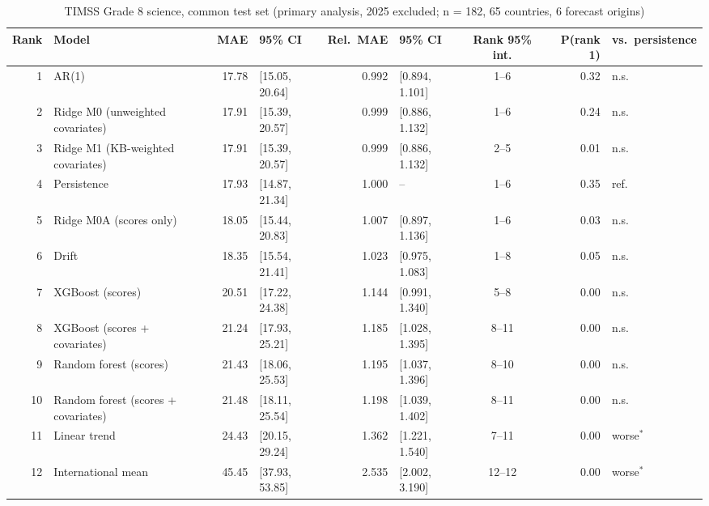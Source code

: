 \begin{table}[htbp]
\centering
\footnotesize
\caption{TIMSS Grade 8 science, common test set (primary analysis, 2025 excluded; n = 182, 65 countries, 6 forecast origins)}
\label{tab:A6}
\begin{tabular}{rlrlrlcrl}
\toprule
Rank & Model & MAE & 95\% CI & Rel.\ MAE & 95\% CI & Rank 95\% int. & P(rank 1) & vs.\ persistence \\
\midrule
1 & AR(1) & 17.78 & [15.05, 20.64] & 0.992 & [0.894, 1.101] & 1--6 & 0.32 & n.s. \\
2 & Ridge M0 (unweighted covariates) & 17.91 & [15.39, 20.57] & 0.999 & [0.886, 1.132] & 1--6 & 0.24 & n.s. \\
3 & Ridge M1 (KB-weighted covariates) & 17.91 & [15.39, 20.57] & 0.999 & [0.886, 1.132] & 2--5 & 0.01 & n.s. \\
4 & Persistence & 17.93 & [14.87, 21.34] & 1.000 & -- & 1--6 & 0.35 & ref. \\
5 & Ridge M0A (scores only) & 18.05 & [15.44, 20.83] & 1.007 & [0.897, 1.136] & 1--6 & 0.03 & n.s. \\
6 & Drift & 18.35 & [15.54, 21.41] & 1.023 & [0.975, 1.083] & 1--8 & 0.05 & n.s. \\
7 & XGBoost (scores) & 20.51 & [17.22, 24.38] & 1.144 & [0.991, 1.340] & 5--8 & 0.00 & n.s. \\
8 & XGBoost (scores + covariates) & 21.24 & [17.93, 25.21] & 1.185 & [1.028, 1.395] & 8--11 & 0.00 & n.s. \\
9 & Random forest (scores) & 21.43 & [18.06, 25.53] & 1.195 & [1.037, 1.396] & 8--10 & 0.00 & n.s. \\
10 & Random forest (scores + covariates) & 21.48 & [18.11, 25.54] & 1.198 & [1.039, 1.402] & 8--11 & 0.00 & n.s. \\
11 & Linear trend & 24.43 & [20.15, 29.24] & 1.362 & [1.221, 1.540] & 7--11 & 0.00 & worse$^{*}$ \\
12 & International mean & 45.45 & [37.93, 53.85] & 2.535 & [2.002, 3.190] & 12--12 & 0.00 & worse$^{*}$ \\
\bottomrule
\end{tabular}
\par{}
\end{table}
